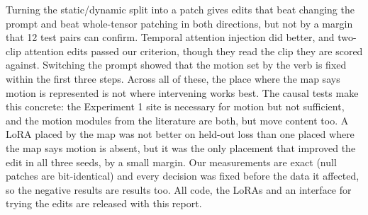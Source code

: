 \documentclass[twoside,english]{article}
\begin{document}
Turning the static/dynamic split into a patch gives edits that beat changing the prompt and beat
whole-tensor patching in both directions, but not by a margin that 12 test pairs can confirm. Temporal
attention injection did better, and two-clip attention edits passed our criterion, though they read the
clip they are scored against. Switching the prompt showed that the motion set by the verb is fixed within
the first three steps. Across all of these, the place where the map says motion is represented is not
where intervening works best. The causal tests make this concrete: the Experiment 1 site is necessary for
motion but not sufficient, and the  motion modules from the literature are both, but move
content too. A LoRA placed by the map was not better on held-out loss than one placed where the map says
motion is absent, but it was the only placement that improved the edit in all three seeds, by a small
margin. Our measurements are exact (null patches are bit-identical) and every decision was fixed before
the data it affected, so the negative results are results too. All code, the LoRAs and an interface for
trying the edits are released with this report.
\end{document}
